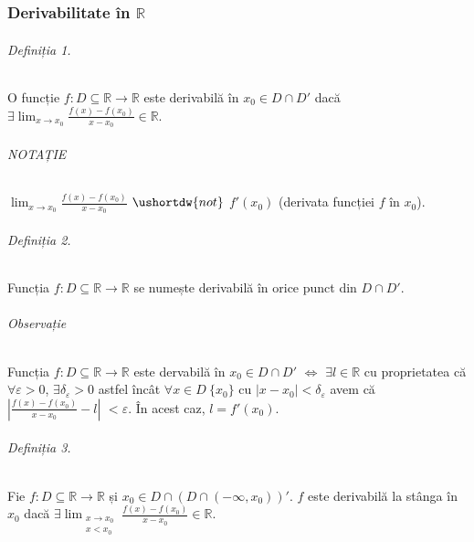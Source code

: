 \part{}
\section{Derivabilitate în $\mathbb{R}$}

\paragraph{Definiția 1.}
O funcție $f:D \subseteq \mathbb{R} \rightarrow \mathbb{R}$ este
derivabilă în $x_{0} \in D \cap D'$ dacă \\[5pt]
$\exists \displaystyle\lim_{x \rightarrow x_{0}} \frac{f(x) - f(x_{0})}{x-x_{0}} \in \mathbb{R}$.

\paragraph{NOTAȚIE} $\displaystyle\lim_{x \rightarrow x_{0}} \frac{f(x) - f(x_{0})}{x-x_{0}}$ $\ushortdw{not}$ $f'(x_{0})$ (derivata funcției $f$ în $x_{0}$).

\paragraph{Definiția 2.}
Funcția $f:D \subseteq \mathbb{R} \rightarrow \mathbb{R}$ se numește derivabilă în orice punct din $D \cap D'$.

\paragraph{Observație}
Funcția $f: D \subseteq \mathbb{R} \rightarrow \mathbb{R}$ este dervabilă în $x_{0} \in D \cap D'$ $\Leftrightarrow$ $\exists l \in \mathbb{R}$ cu proprietatea că $\forall \varepsilon > 0$,
$\exists \delta_{\varepsilon} > 0$ astfel încât $\forall x \in D \ \{x_{0}\}$ cu $\lvert x - x_{0} \rvert < \delta_{\varepsilon}$ avem că
$\left| \frac{\displaystyle f(x) - f(x_{0})}{\displaystyle x-x_{0}} - l
\right|$ $ < \varepsilon$. În acest caz, $l = f'(x_{0})$.

\paragraph{Definiția 3.}
Fie $f:D \subseteq \mathbb{R} \rightarrow \mathbb{R}$ și $x_{0} \in D \cap (D \cap (-\infty, x_{0}))'$. $f$ este derivabilă la stânga în $x_{0}$ dacă
$\exists \displaystyle\lim_{\substack{x \rightarrow x_{0} \\ x<x_{0}}} \frac{f(x) - f(x_{0})}{x-x_{0}} \in \mathbb{R}$.

